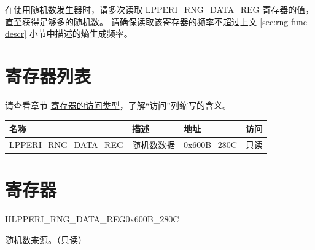 \documentclass[main\_\_CN.tex]{subfiles}
\begin{document}
在使用随机数发生器时，请多次读取 \hyperref[regdesc:LPPERIRNGDATAREG]{LPPERI\_RNG\_DATA\_REG} 寄存器的值，直至获得足够多的随机数。
请确保读取该寄存器的频率不超过上文 \ref{sec:rng-func-descr} 小节中描述的熵生成频率。


\hypertarget{rng-reg-summ}{}
\section{寄存器列表}
\label{sec:rng-reg-summ}
请查看章节 \hyperref[glossary-access-types]{寄存器的访问类型}，了解“访问”列缩写的含义。


\begin{table}[H]
    \centering
    \begin{tabular}{ | l | l | l | l |  }
    \hline
    \rowcolor{lightgray}
    \textbf{名称} & \textbf{描述} & \textbf{地址} & \textbf{访问} \\
    \hline
    \hyperref[regdesc:LPPERIRNGDATAREG]{LPPERI\_RNG\_DATA\_REG} & 随机数数据 & 0x600B\_280C & 只读 \\
    \hline
    \end{tabular}
\end{table}





\section{寄存器}

\begin{register}{H}{LPPERI\_RNG\_DATA\_REG}{0x600B\_280C}\label{regdesc:LPPERIRNGDATAREG}
%
\regnewline%
\begin{regdesc}\begin{reglist}
\item [LPPERI\_RNG\_DATA]随机数来源。（只读）
\end{reglist}\end{regdesc}
\end{register}
\end{document}
